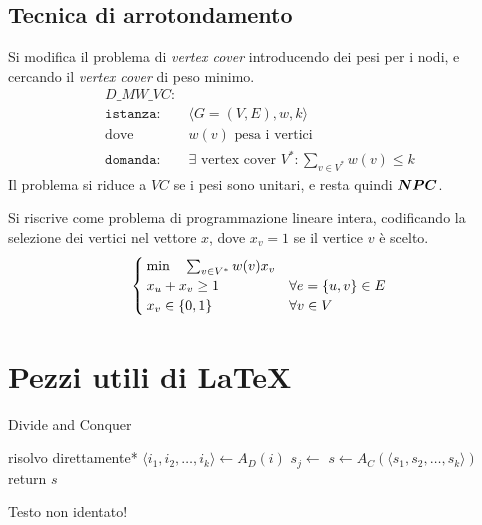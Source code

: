 \subsection{Tecnica di arrotondamento}

Si modifica il problema di \emph{vertex cover} introducendo dei pesi per i nodi, e cercando il \emph{vertex cover} di peso minimo.
\begin{align*}
    D\_MW\_VC: & \\
    \texttt{istanza:} \quad & \langle G=(V,E), w, k \rangle \\
    \text{dove} \quad &
    w(v) \text{ pesa i vertici}
    \\
    \texttt{domanda:} \quad &
    \exists \text{ vertex cover } V^* :
    \sum_{v \in V^*} w(v) \leq k
\end{align*}
Il problema si riduce a $VC$ se i pesi sono unitari, e resta quindi $\bm{NPC}$.

Si riscrive come problema di programmazione lineare intera, codificando la selezione dei vertici nel vettore $x$, dove $x_v=1$ se il vertice $v$ è scelto.
\begin{equation*}
    \begin{cases}
        \min \quad \sum_{v \in V^*} w(v) x_v
        \\
        x_u + x_v \geq 1
        &
        \forall e = \left\{ u,v \right\} \in E
        \\
        x_v \in \left\{0,1\right\}^{}
        &
        \forall v \in V
    \end{cases}
\end{equation*}


\section{Pezzi utili di \LaTeX{}}
\begin{algorithm}[H]
\caption{Divide and Conquer}\label{alg:dnc}
\begin{algorithmic}[1]
            \State *risolvo direttamente*
        \EndIf
        \State $\langle i_1, i_2, \dots, i_k \rangle \gets A_D(i)$ 
            \State $s_j \gets $ 
        \EndFor
        \State $s \gets A_C(\langle s_1, s_2, \dots, s_k \rangle)$
        \State return $s$
    \EndProcedure
\end{algorithmic}
\end{algorithm}
\noindent
Testo non identato!

